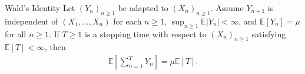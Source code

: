 \begin{thrm}{Wald's Identity}{}
Let \((Y_{n} )_{n\geq 1}\) be adapted to \((X_{n} )_{n \geq 1}\). Assume \(Y_{n + 1} \) is independent of \((X_1, \dots ,X_{n} )\) for each \(n\geq 1\), \(\sup _{n \geq 1} \mathbb{E} \left\lvert Y_{n}  \right\rvert  < \infty \), and \(\mathbb{E} [Y_{n} ] = \mu \) for all \(n \geq 1\). If \(T \geq 1\) is a stopping time with respect to \((X_{n} )_{n \geq 1}\) satisfying \(\mathbb{E} [T] < \infty \), then 
\begin{align*}
    \mathbb{E} \left[ \sum_{n = 1}^{T} Y_{n}  \right] = \mu \mathbb{E} [T].
\end{align*}

\end{thrm}

